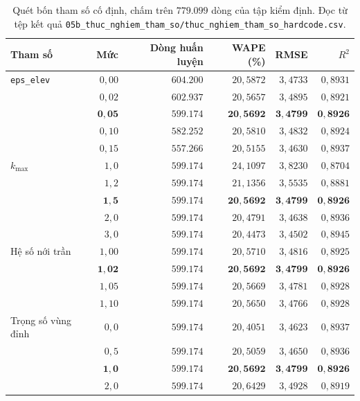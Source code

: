\documentclass[12pt, a4paper]{report}
\begin{document}
\begin{table}[htbp]
\centering
\caption{Quét bốn tham số cố định, chấm trên $779.099$ dòng của tập kiểm định. Đọc từ tệp kết
quả \texttt{05b\_thuc\_nghiem\_tham\_so/thuc\_nghiem\_tham\_so\_hardcode.csv}.}
\label{tab:quet_tham_so}
\small
\begin{tabular}{l r r r r r}
\toprule
\textbf{Tham số} & \textbf{Mức} & \textbf{Dòng huấn luyện} & \textbf{WAPE (\%)} & \textbf{RMSE} & \textbf{$R^2$} \\
\midrule
\texttt{eps\_elev}
 & $0{,}00$ & $604.200$ & $20{,}5872$ & $3{,}4733$ & $0{,}8931$ \\
 & $0{,}02$ & $602.937$ & $20{,}5657$ & $3{,}4895$ & $0{,}8921$ \\
 & $\mathbf{0{,}05}$ & $\mathbf{599.174}$ & $\mathbf{20{,}5692}$ & $\mathbf{3{,}4799}$ & $\mathbf{0{,}8926}$ \\
 & $0{,}10$ & $582.252$ & $20{,}5810$ & $3{,}4832$ & $0{,}8924$ \\
 & $0{,}15$ & $557.266$ & $20{,}5155$ & $3{,}4630$ & $0{,}8937$ \\
\midrule
$k_{\max}$
 & $1{,}0$ & $599.174$ & $24{,}1097$ & $3{,}8230$ & $0{,}8704$ \\
 & $1{,}2$ & $599.174$ & $21{,}1356$ & $3{,}5535$ & $0{,}8881$ \\
 & $\mathbf{1{,}5}$ & $\mathbf{599.174}$ & $\mathbf{20{,}5692}$ & $\mathbf{3{,}4799}$ & $\mathbf{0{,}8926}$ \\
 & $2{,}0$ & $599.174$ & $20{,}4791$ & $3{,}4638$ & $0{,}8936$ \\
 & $3{,}0$ & $599.174$ & $20{,}4473$ & $3{,}4502$ & $0{,}8945$ \\
\midrule
Hệ số nới trần
 & $1{,}00$ & $599.174$ & $20{,}5710$ & $3{,}4816$ & $0{,}8925$ \\
 & $\mathbf{1{,}02}$ & $\mathbf{599.174}$ & $\mathbf{20{,}5692}$ & $\mathbf{3{,}4799}$ & $\mathbf{0{,}8926}$ \\
 & $1{,}05$ & $599.174$ & $20{,}5669$ & $3{,}4781$ & $0{,}8928$ \\
 & $1{,}10$ & $599.174$ & $20{,}5650$ & $3{,}4766$ & $0{,}8928$ \\
\midrule
Trọng số vùng đỉnh
 & $0{,}0$ & $599.174$ & $20{,}4051$ & $3{,}4623$ & $0{,}8937$ \\
 & $0{,}5$ & $599.174$ & $20{,}5059$ & $3{,}4650$ & $0{,}8936$ \\
 & $\mathbf{1{,}0}$ & $\mathbf{599.174}$ & $\mathbf{20{,}5692}$ & $\mathbf{3{,}4799}$ & $\mathbf{0{,}8926}$ \\
 & $2{,}0$ & $599.174$ & $20{,}6429$ & $3{,}4928$ & $0{,}8919$ \\
\bottomrule
\end{tabular}
\caption[Quét bốn tham số cố định, chấm trên $779.099$ dòng của tập kiểm định]{Quét bốn tham số cố định, chấm trên $779.099$ dòng của tập kiểm định. Đọc từ tệp kết
quả \texttt{05b\_thuc\_nghiem\_tham\_so/thuc\_nghiem\_tham\_so\_hardcode.csv}.}
\label{tab:quet_tham_so}
\end{table}
\end{document}
